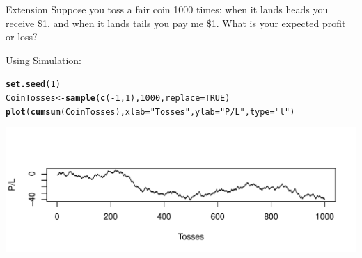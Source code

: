 \documentclass[t,xcolor=pdftex,dvipsnames,table]{beamer}\usepackage[]{graphicx}\usepackage[]{color}
\makeatletter
\def\maxwidth{ %
  \ifdim\Gin@nat@width>\linewidth
    \linewidth
  \else
    \Gin@nat@width
  \fi
}
\newcommand{\hlnum}[1]{\textcolor[rgb]{0.686,0.059,0.569}{#1}}%
\newcommand{\hlstr}[1]{\textcolor[rgb]{0.192,0.494,0.8}{#1}}%
\newcommand{\hlopt}[1]{\textcolor[rgb]{0,0,0}{#1}}%
\newcommand{\hlstd}[1]{\textcolor[rgb]{0.345,0.345,0.345}{#1}}%
\newcommand{\hlkwb}[1]{\textcolor[rgb]{0.69,0.353,0.396}{#1}}%
\newcommand{\hlkwc}[1]{\textcolor[rgb]{0.333,0.667,0.333}{#1}}%
\newcommand{\hlkwd}[1]{\textcolor[rgb]{0.737,0.353,0.396}{\textbf{#1}}}%
\newenvironment{kframe}{%
 \def\at@end@of@kframe{}%
 \ifinner\ifhmode%
  \def\at@end@of@kframe{\end{minipage}}%
  \begin{minipage}{\columnwidth}%
 \fi\fi%
 \def\FrameCommand##1{\hskip\@totalleftmargin \hskip-\fboxsep
 \colorbox{shadecolor}{##1}\hskip-\fboxsep
     \hskip-\linewidth \hskip-\@totalleftmargin \hskip\columnwidth}%
 \MakeFramed {\advance\hsize-\width
   \@totalleftmargin\z@ \linewidth\hsize
   \@setminipage}}%
 {\par\unskip\endMakeFramed%
 \at@end@of@kframe}
\newenvironment{knitrout}{}{} %
\makeatother
\begin{document}
\begin{frame}[fragile]{}
\begin{alertblock}{Extension}
Suppose you toss a fair coin 1000 times:  when it lands heads
you receive \$1, and when it lands tails you pay me \$1.
What is your expected profit or loss?
\end{alertblock}

Using Simulation:
\begin{knitrout}
\color{fgcolor}\begin{kframe}
\begin{alltt}
\hlkwd{set.seed}\hlstd{(}\hlnum{1}\hlstd{)}
\hlstd{CoinTosses} \hlkwb{<-} \hlkwd{sample}\hlstd{(}\hlkwd{c}\hlstd{(}\hlopt{-}\hlnum{1}\hlstd{,}\hlnum{1}\hlstd{),} \hlnum{1000}\hlstd{,} \hlkwc{replace} \hlstd{=} \hlnum{TRUE}\hlstd{)}
\hlkwd{plot}\hlstd{(}\hlkwd{cumsum}\hlstd{(CoinTosses),}\hlkwc{xlab}\hlstd{=}\hlstr{"Tosses"}\hlstd{,} \hlkwc{ylab}\hlstd{=}\hlstr{"P/L"}\hlstd{,} \hlkwc{type}\hlstd{=}\hlstr{"l"}\hlstd{)}
\end{alltt}
\end{kframe}
\includegraphics[width=\maxwidth]{figure/unnamed-chunk-58-1} 

\end{knitrout}
\end{frame}
\end{document}
